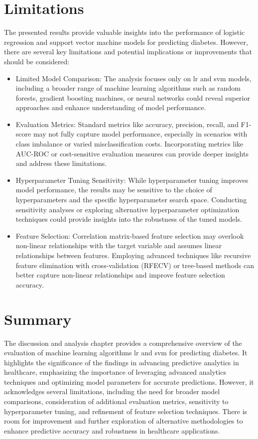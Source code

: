 \section{Limitations} 
The presented results provide valuable insights into the performance of logistic regression and support vector machine models for predicting diabetes. However, there are several key limitations and potential implications or improvements that should be considered:
\begin{itemize}
\item Limited Model Comparison: The analysis focuses only on lr and svm models, including a broader range of machine learning algorithms such as random forests, gradient boosting machines, or neural networks  could reveal superior approaches and enhance understanding of model performance.

\item Evaluation Metrics: Standard metrics like accuracy, precision, recall, and F1-score may not fully capture model performance, especially in scenarios with class imbalance or varied misclassification costs. Incorporating metrics like AUC-ROC or cost-sensitive evaluation measures can provide deeper insights and address these limitations.

\item Hyperparameter Tuning Sensitivity: While hyperparameter tuning improves model performance, the results may be sensitive to the choice of hyperparameters and the specific hyperparameter search space. Conducting sensitivity analyses or exploring alternative hyperparameter optimization techniques could provide insights into the robustness of the tuned models.

\item Feature Selection: Correlation matrix-based feature selection may overlook non-linear relationships with the target variable and assumes linear relationships between features. Employing advanced techniques like recursive feature elimination with cross-validation (RFECV) or tree-based methods can better capture non-linear relationships and improve feature selection accuracy.

\end{itemize}
\section{Summary}
The discussion and analysis chapter provides a comprehensive overview of the evaluation of machine learning algorithms lr and svm for predicting diabetes. It highlights the significance of the findings in advancing predictive analytics in healthcare, emphasizing the importance of leveraging advanced analytics techniques and optimizing model parameters for accurate predictions. However, it acknowledges several limitations, including the need for broader model comparisons, consideration of additional evaluation metrics, sensitivity to hyperparameter tuning, and refinement of feature selection techniques. There is room for improvement and further exploration of alternative methodologies to enhance predictive accuracy and robustness in healthcare applications.